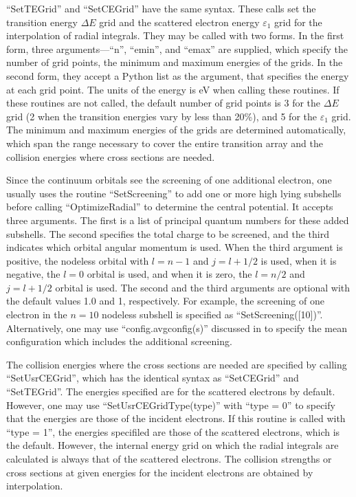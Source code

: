 \documentclass{elsart}
\begin{document}
``SetTEGrid'' and ``SetCEGrid'' have the same syntax. These calls set the
transition energy $\Delta E$ grid and the scattered electron energy
$\varepsilon_1$ grid for the interpolation of radial integrals. They may be
called with two forms. In the first form, three arguments---``n'', ``emin'',
and ``emax'' are supplied, which specify the number of grid points, the
minimum and maximum energies of the grids. In the second form, they accept a
Python list as the argument, that specifies the energy at each grid point. The
units of the energy is eV when calling these routines. If these routines are
not called, the default number of grid points is 3 for the $\Delta E$ grid (2
when the transition energies vary by less than 20\%),
and 5 for the $\varepsilon_1$ grid. The minimum and maximum energies of the
grids are determined automatically, which span the range necessary to cover the
entire transition array and the collision energies where cross sections are
needed. 

Since the continuum orbitals see the screening of one additional electron, one
usually uses the routine ``SetScreening'' to add one or more high lying
subshells before calling ``OptimizeRadial'' to determine the central
potential. It accepts three arguments. The first is a list of principal
quantum numbers for these added subshells. The second specifies the total
charge to be screened, and the third indicates which orbital angular momentum
is used. When the third argument is positive, the nodeless orbital with $l =
n-1$ and $j = l+1/2$ is used, when it is negative, the $l = 0$ orbital is
used, and when it is zero, the $l = n/2$ and $j = l+1/2$ orbital is used. The
second and the third arguments are optional with the default values 1.0 and 1,
respectively. For example, the screening of one electron in the $n = 10$
nodeless subshell is specified as ``SetScreening([10])''. Alternatively, one
may use ``config.avgconfig(s)'' discussed in  to specify the
mean configuration which includes the additional screening.

The collision energies where the cross sections are needed are specified by
calling ``SetUsrCEGrid'', which has the identical syntax as ``SetCEGrid'' and
``SetTEGrid''. The energies specified are for the scattered electrons by
default. However, one may use ``SetUsrCEGridType(type)'' with ``type = 0'' to
specify that the energies are those of the incident electrons. If this routine
is called with ``type = 1'', the energies specifiled are those of the
scattered electrons, which is the default. However,
the internal energy grid on which the radial integrals are calculated is
always that of the scattered electrons. The collision strengths or cross
sections at given energies for the incident electrons are obtained by
interpolation. 
\end{document}
